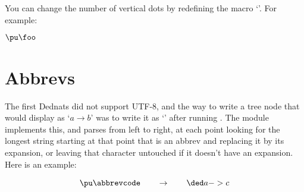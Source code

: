 \documentclass[oneside]{article}
\begin{document}
You can change the number of vertical dots by redefining the macro
`\co{\\DeduceSym}'. For example:

\msk

%
%
$\pu\foo$





%

\section{Abbrevs}

The first Dednats did not support UTF-8, and the way to write a tree
node that would display as `$a→b$' was to write it as `'
after running . The module
 implements this, and  parses
 from left to right, at each point looking for the longest
string starting at that point that is an abbrev and replacing it by
its expansion, or leaving that character untouched if it doesn't have
an expansion. Here is an example:



$$\pu
  \myvcenter{\abbrevcode}
  \qquad
  \to
  \qquad
  \cded{a->c}
$$

\end{document}
